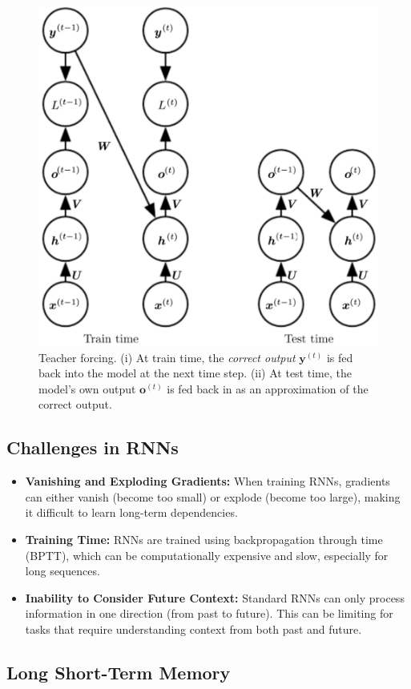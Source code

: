 \begin{figure}[H]
  \centering
  \includegraphics[width=0.7\linewidth]{images/teacher_forcing.png}
  \caption{Teacher forcing. (i) At train time, the \textit{correct output} $\mathbf{y}^{(t)}$ is fed back into the model at the next time step. (ii) At test time, the model's own output ${\mathbf{o}}^{(t)}$ is fed back in as an approximation of the correct output.}
\end{figure}

\subsection*{Challenges in RNNs}

\begin{itemize}
  \item \textbf{Vanishing and Exploding Gradients:} When training RNNs, gradients can either vanish (become too small) or explode (become too large), making it difficult to learn long-term dependencies.
  \item \textbf{Training Time:} RNNs are trained using backpropagation through time (BPTT), which can be computationally expensive and slow, especially for long sequences.
  \item \textbf{Inability to Consider Future Context:} Standard RNNs can only process information in one direction (from past to future). This can be limiting for tasks that require understanding context from both past and future.
\end{itemize}

\subsection*{Long Short-Term Memory}

